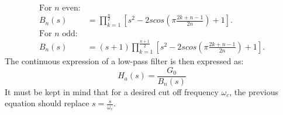 \documentclass[twoside,twocolumn]{article}
\begin{document}
\begin{equation}
\begin{split}
\text{For } n \text{ even:}\\
B_n(s)&=\prod_{k=1}^{\frac{n}{2}}[s^2-2s cos(\pi\frac{2k+n-1}{2n})+1].\\ 
\text{For } n \text{ odd:}\\
B_n(s)&=(s+1)\prod_{k=1}^{\frac{n+1}{2}}[s^2-2s cos(\pi\frac{2k+n-1}{2n})+1]. 
\end{split}	
\end{equation}
The continuous expression of a low-pass filter is then expressed as:
\begin{equation}
H_a(s)=\frac{G_0}{B_n(s)}
\end{equation}
It must be kept in mind that for a desired cut off frequency $\omega_c$, the previous equation should replace $s=\frac{s}{\omega_c}$.
\end{document}

